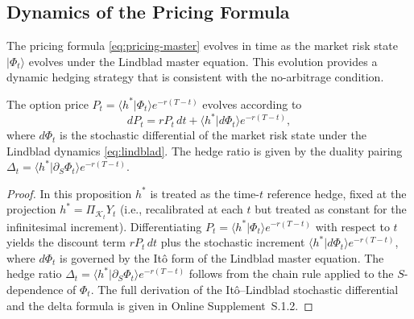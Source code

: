 \subsection{Dynamics of the Pricing Formula}

The pricing formula \eqref{eq:pricing-master} evolves in time as the market risk
state $|\Phi_t\rangle$ evolves under the Lindblad master equation. This evolution
provides a dynamic hedging strategy that is consistent with the no-arbitrage
condition.

\begin{proposition}\label{prop:price-dynamics}
The option price $P_t = \langle h^* | \Phi_t \rangle e^{-r(T-t)}$ evolves according
to
\begin{equation*}
    dP_t = r P_t \, dt + \langle h^* | d\Phi_t \rangle e^{-r(T-t)},
\end{equation*}
where $d\Phi_t$ is the stochastic differential of the market risk state under the
Lindblad dynamics \eqref{eq:lindblad}. The hedge ratio is given by the duality
pairing $\Delta_t = \langle h^* | \partial_S \Phi_t \rangle e^{-r(T-t)}$.
\end{proposition}

\begin{proof}
In this proposition $h^*$ is treated as the time-$t$ reference hedge, fixed at
the projection $h^* = \Pi_{\mathcal{K}_t}Y_t$ (i.e., recalibrated at each $t$ but
treated as constant for the infinitesimal increment). Differentiating
$P_t = \langle h^* | \Phi_t \rangle e^{-r(T-t)}$ with respect to $t$ yields the
discount term $rP_t\,dt$ plus the stochastic increment
$\langle h^* | d\Phi_t \rangle e^{-r(T-t)}$, where $d\Phi_t$ is governed by the
It\^o form of the Lindblad master equation. The hedge ratio
$\Delta_t = \langle h^* | \partial_S \Phi_t \rangle e^{-r(T-t)}$ follows from the
chain rule applied to the $S$-dependence of $\Phi_t$. The full derivation of the
It\^o--Lindblad stochastic differential and the delta formula is given in
Online Supplement~S.1.2.
\end{proof}
